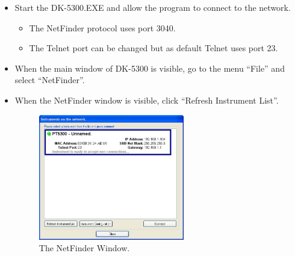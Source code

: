 \begin{itemize}
\item Start the DK-5300.EXE and allow the program to connect to the network.
	\begin{itemize}
		\item The NetFinder protocol uses port 3040.
		\item The Telnet port can be changed but as default Telnet uses port 23.
	\end{itemize}
\item When the main window of DK-5300 is visible, go to the menu ``File'' and select ``NetFinder''.
\item When the NetFinder window is visible, click ``Refresh Instrument List''.

\begin{figure}[hbt]
\centering
\includegraphics[width=0.6\textwidth]{fig/NetFinder_Search}
\caption{The NetFinder Window.\label{fig:NetFinderWindow}}
\end{figure}


\end{itemize}
